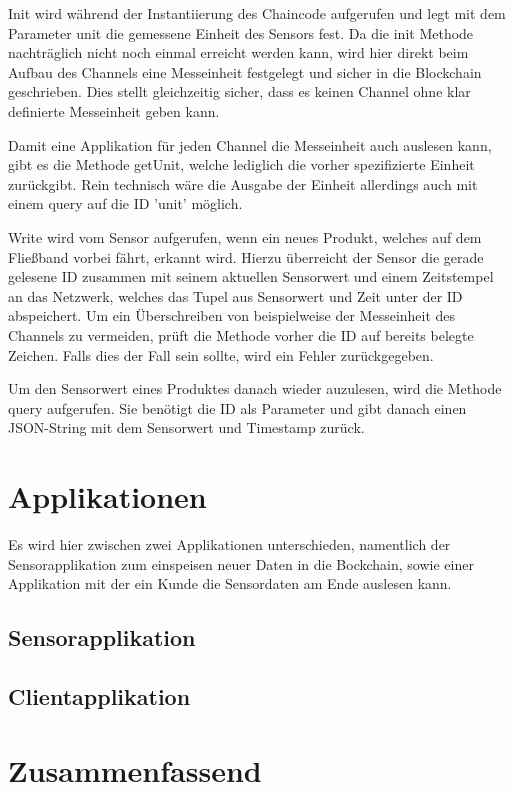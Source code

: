 \documentclass{article}
\begin{document}
Init wird während der Instantiierung des Chaincode aufgerufen und legt mit dem Parameter unit die gemessene Einheit des Sensors fest. Da die init Methode nachträglich nicht noch einmal erreicht werden kann, wird hier direkt beim Aufbau des Channels eine Messeinheit festgelegt und sicher in die Blockchain geschrieben. Dies stellt gleichzeitig sicher, dass es keinen Channel ohne klar definierte Messeinheit geben kann.

Damit eine Applikation für jeden Channel die Messeinheit auch auslesen kann, gibt es die Methode getUnit, welche lediglich die vorher spezifizierte Einheit zurückgibt. Rein technisch wäre die Ausgabe der Einheit allerdings auch mit einem query auf die ID 'unit' möglich.

Write wird vom Sensor aufgerufen, wenn ein neues Produkt, welches auf dem Fließband vorbei fährt, erkannt wird. Hierzu überreicht der Sensor die gerade gelesene ID zusammen mit seinem aktuellen Sensorwert und einem Zeitstempel an das Netzwerk, welches das Tupel aus Sensorwert und Zeit unter der ID abspeichert. Um ein Überschreiben von beispielweise der Messeinheit des Channels zu vermeiden, prüft die Methode vorher die ID auf bereits belegte Zeichen. Falls dies der Fall sein sollte, wird ein Fehler zurückgegeben.

Um den Sensorwert eines Produktes danach wieder auzulesen, wird die Methode query aufgerufen. Sie benötigt die ID als Parameter und gibt danach einen JSON-String mit dem Sensorwert und Timestamp zurück.

\section{Applikationen}
Es wird hier zwischen zwei Applikationen unterschieden, namentlich der Sensorapplikation zum einspeisen neuer Daten in die Bockchain, sowie einer Applikation mit der ein Kunde die Sensordaten am Ende auslesen kann.

\subsection{Sensorapplikation}

\subsection{Clientapplikation}

\section{Zusammenfassend}




\end{document}
